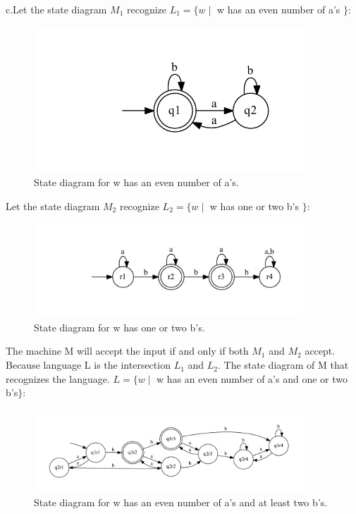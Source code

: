 \documentclass[10pt] {article}
\begin{document}
\begin{enumerate}
\begin{figure}[H]
\label{6}
\end{figure}
c.Let the state diagram $M_1$ recognize 
$L_1 = \{ w \mid$ w has an even number of a's $\}$:
\begin{figure}[H]
\includegraphics[width=0.9\textwidth]{ca14.pdf}
\caption{State diagram for w has an even number of a's.}
\label{7}
\end{figure} 
Let the state diagram $M_2$ recognize 
$L_2 = \{ w \mid$ w has one or two b's $\}$:
\begin{figure}[H]
\includegraphics[width=0.9\textwidth]{cb14.pdf}
\caption{State diagram for w has one or two b's.}
\label{8}
\end{figure}
The machine M will accept the input if and only if both $M_1$ and $M_2$ accept. Because language L is the intersection $L_1$ and $L_2$.
The state diagram of M that recognizes the language. $L = \{ w \mid$ w has an even number of a's and one or two b's$\}$: 
\begin{figure}[H]
\includegraphics[width=0.9\textwidth]{cc14.pdf}
\caption{State diagram for w has an even number of a's and at least two b's.}
\label{9}

\end{figure}
\end{enumerate}
\end{document}
